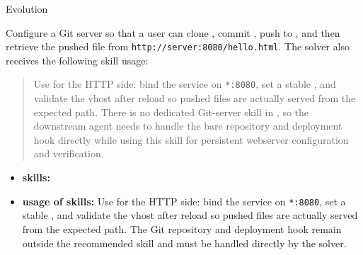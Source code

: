 \begin{svpromptbox}{Evolution}

Configure a Git server so that a user can clone , commit , push to , and then retrieve the pushed file from \texttt{http://server:8080/hello.html}. The solver also receives the following skill usage:

\begin{quote}
Use  for the HTTP side: bind the service on \texttt{*:8080}, set a stable , and validate the vhost after reload so pushed files are actually served from the expected path. There is no dedicated Git-server skill in , so the downstream agent needs to handle the bare repository and  deployment hook directly while using this skill for persistent webserver configuration and verification.
\end{quote}

\svpartsep
{}
\begin{itemize}
    \item \textbf{skills:} 
    \item \textbf{usage of skills:} Use  for the HTTP side: bind the service on \texttt{*:8080}, set a stable , and validate the vhost after reload so pushed files are actually served from the expected path. The Git repository and  deployment hook remain outside the recommended skill and must be handled directly by the solver.
\end{itemize}


\end{svpromptbox}
